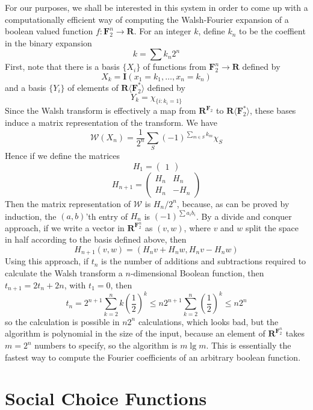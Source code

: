 For our purposes, we shall be interested in this system in order to come up with a computationally efficient way of computing the Walsh-Fourier expansion of a boolean valued function $f: \mathbf{F}_2^n \to \mathbf{R}$. For an integer $k$, define $k_n$ to be the coeffient in the binary expansion
%
\[ k = \sum k_n 2^n \]
%
First, note that there is a basis $\{ X_i \}$ of functions from $\mathbf{F}_2^n \to \mathbf{R}$ defined by
%
\[ X_k = \mathbf{I}(x_1 = k_1, \dots, x_n = k_n) \]
%
and a basis $\{ Y_i \}$ of elements of $\mathbf{R} \langle \mathbf{F}_2^* \rangle$ defined by
%
\[ Y_k = \chi_{\{ i : k_i = 1 \}}  \]
%
Since the Walsh transform is effectively a map from $\mathbf{R}^{\mathbf{F}_2}$ to $\mathbf{R} \langle \mathbf{F}_2^* \rangle$, these bases induce a matrix representation of the transform. We have
%
\[ \mathcal{W}(X_n) = \frac{1}{2^n} \sum_S (-1)^{\sum_{m \in S} k_m} \chi_S \]
%
Hence if we define the matrices
%
\[ H_1 = \begin{pmatrix} 1 \end{pmatrix} \]
\[ H_{n+1} = \begin{pmatrix} H_n & H_n \\ H_n & -H_n \end{pmatrix} \]
%
Then the matrix representation of $\mathcal{W}$ is $H_n/2^n$, because, as can be proved by induction, the $(a,b)$'th entry of $H_n$ is $(-1)^{\sum a_i b_i}$. By a divide and conquer approach, if we write a vector in $\mathbf{R}^{\mathbf{F}_2^n}$ as $(v,w)$, where $v$ and $w$ split the space in half according to the basis defined above, then
%
\[ H_{n+1}(v,w) = (H_nv + H_nw, H_nv - H_nw) \]
%
Using this approach, if $t_n$ is the number of additions and subtractions required to calculate the Walsh transform a $n$-dimensional Boolean function, then $t_{n+1} = 2t_n + 2n$, with $t_1 = 0$, then
%
\[ t_n = 2^{n+1} \sum_{k = 2}^n k \left(\frac{1}{2}\right)^{k} \leq n2^{n+1} \sum_{k = 2}^n \left( \frac{1}{2} \right)^k \leq n2^n \]
%
so the calculation is possible in $n2^n$ calculations, which looks bad, but the algorithm is polynomial in the size of the input, because an element of $\mathbf{R}^{\mathbf{F}_2^n}$ takes $m = 2^n$ numbers to specify, so the algorithm is $m \lg m$. This is essentially the fastest way to compute the Fourier coefficients of an arbitrary boolean function.




\chapter{Social Choice Functions}

